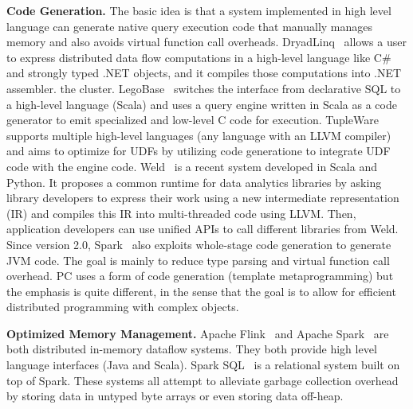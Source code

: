 \vspace{5pt}
\noindent
\textbf{Code Generation.} The basic idea is that a system implemented in high level language
can generate native query execution code that manually manages
memory and also avoids virtual function call
overheads. DryadLinq~\cite{yu2008dryadlinq} allows a user to express
distributed data flow
computations in a high-level language like C\# and strongly typed .NET
objects, and it compiles those computations into .NET assembler.
the cluster. 
LegoBase~\cite{klonatos2014building} switches the interface
from declarative SQL to a high-level language (Scala) and uses a query engine
written in Scala as a code generator to emit specialized and low-level
C code for execution. TupleWare~\cite{crotty2015tupleware} supports
multiple high-level languages (any language with an LLVM compiler) 
and aims to
optimize for UDFs by utilizing code
generatione to integrate UDF code with the engine 
code. 
Weld~\cite{palkar2017weld} is a recent system developed in Scala and
Python. It proposes
a common runtime for data analytics libraries by asking library
developers to express their work using a new intermediate
representation (IR) and compiles this IR into multi-threaded code using
LLVM.  Then, application developers can use unified APIs to
call different libraries from Weld. Since version 2.0, Spark~\cite{zaharia2012resilient}
also exploits whole-stage code generation to generate JVM 
code.  The goal is mainly to reduce type parsing and virtual function call
overhead. PC uses a form of code generation (template metaprogramming) but 
the emphasis is quite different, in the sense that the goal is to allow for
efficient distributed programming with complex objects.

\vspace{5pt}
\noindent
\textbf{Optimized Memory Management.} 
Apache Flink~\cite{alexandrov2014stratosphere} and Apache
Spark~\cite{zaharia2012resilient} are both distributed in-memory
dataflow systems. They both provide high level language interfaces (Java and Scala).
Spark SQL~\cite{armbrust2015spark} is a relational system built on top
of Spark. These systems all attempt to 
alleviate garbage collection overhead by storing data
in untyped byte arrays or even storing data off-heap.

